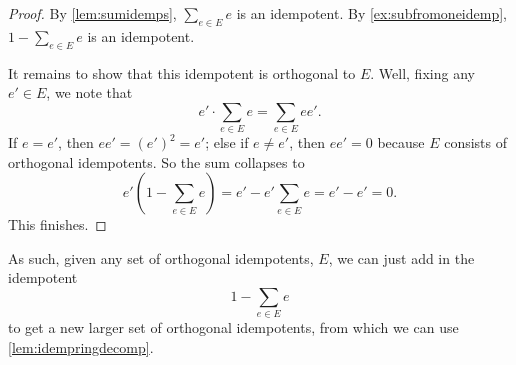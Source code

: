 \documentclass[../notes.tex]{subfiles}
\begin{document}
\begin{proof}
	By \autoref{lem:sumidemps}, $\sum_{e\in E}e$ is an idempotent. By \autoref{ex:subfromoneidemp}, $1-\sum_{e\in E}e$ is an idempotent.

	It remains to show that this idempotent is orthogonal to $E$. Well, fixing any $e'\in E$, we note that
	\[e'\cdot\sum_{e\in E}e=\sum_{e\in E}ee'.\]
	If $e=e'$, then $ee'=(e')^2=e'$; else if $e\ne e'$, then $ee'=0$ because $E$ consists of orthogonal idempotents. So the sum collapses to
	\[e'\left(1-\sum_{e\in E}e\right)=e'-e'\sum_{e\in E}e=e'-e'=0.\]
	This finishes.
\end{proof}
As such, given any set of orthogonal idempotents, $E$, we can just add in the idempotent
\[1-\sum_{e\in E}e\]
to get a new larger set of orthogonal idempotents, from which we can use \autoref{lem:idempringdecomp}.
\end{document}
